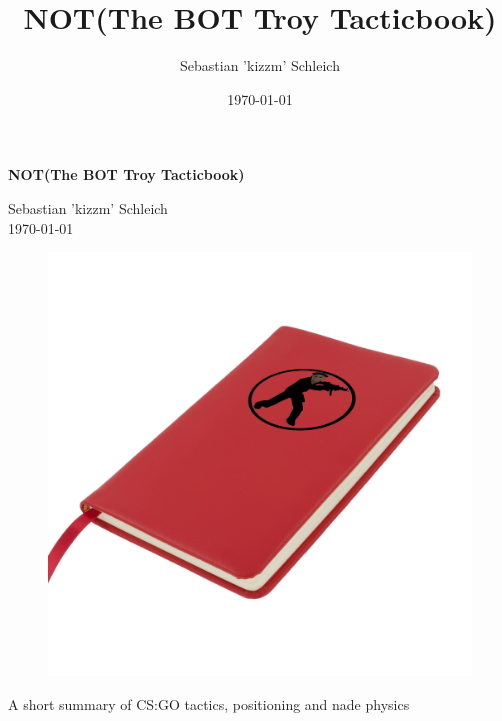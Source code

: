 
\begin{titlepage}
\title{NOT(The BOT Troy Tacticbook)}
\author{Sebastian 'kizzm' Schleich}
\date{\today}

\begin{center} 
\label{titelpage}
\vfill{}{\Huge \textbf {NOT(The BOT Troy Tacticbook)}}
	
{\large Sebastian 'kizzm' Schleich \\ \today}

\vfill{}{
\begin{figure}[!h]
	\begin{center}
			\includegraphics[scale=0.2]{pictures/botTroyBook} 
	\end{center}
\end{figure}
}

\vfill{}{\large A short summary of CS:GO tactics, positioning and nade physics}
\end{center}
\end{titlepage}
